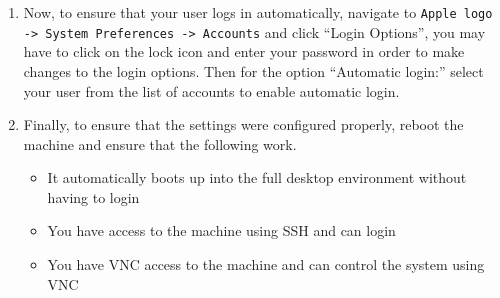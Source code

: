 \begin{enumerate}
\item	Now, to ensure that your user logs in automatically, navigate to \verb|Apple logo -> System Preferences -> Accounts| and click
		``Login Options'', you may have to click on the lock icon and enter your password in order to make changes to the login options. 
		Then for the option ``Automatic login:'' select your user from the list of accounts to enable automatic login.
		
\item 	Finally, to ensure that the settings were configured properly, reboot the machine and ensure that the following work.
\begin{itemize}
\item	It automatically boots up into the full desktop environment without having to login
\item	You have access to the machine using SSH and can login
\item	You have VNC access to the machine and can control the system using VNC	
\end{itemize}
\end{enumerate}




